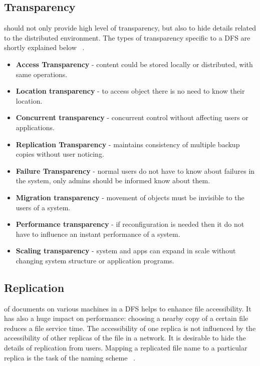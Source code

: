 \documentclass[a4paper,12pt,fleqn]{article}
\begin{document}
\subsection{Transparency}
 should not only provide high level of transparency, but also to hide details related to the distributed environment. The types of transparency specific to a DFS are shortly explained below ~\cite{mantena6306transparency}.
\begin{itemize}
    \item \textbf{Access Transparency} - content could be stored locally or distributed, with same operations.
    \item \textbf{Location transparency} - to access object there is no need to know their location.
    \item \textbf{Concurrent transparency} - concurrent control without affecting users or applications.
    \item \textbf{Replication Transparency} - maintains consistency of multiple backup copies without user noticing.
    \item \textbf{Failure Transparency} - normal users do not have to know about failures in the system, only admins should be informed know about them.
    \item \textbf{Migration transparency} - movement of objects must be invisible to the users of a system.
    \item \textbf{Performance transparency} - if reconfiguration is needed then it do not have to influence an instant performance of a system.
    \item \textbf{Scaling transparency} - system and apps can expand in scale without changing system structure or application programs.
    \end{itemize}

\subsection{Replication}
 of documents on various machines in a DFS helps to enhance file accessibility. It has also a huge impact on performance: choosing a nearby copy of a certain file reduces a file service time. The accessibility of one replica is not influenced by the accessibility of other replicas of the file in a network. It is desirable to hide the details of replication from users. Mapping a replicated file name to a particular replica is the task of the naming scheme ~\cite{levy1990distributed}.
\end{document}
